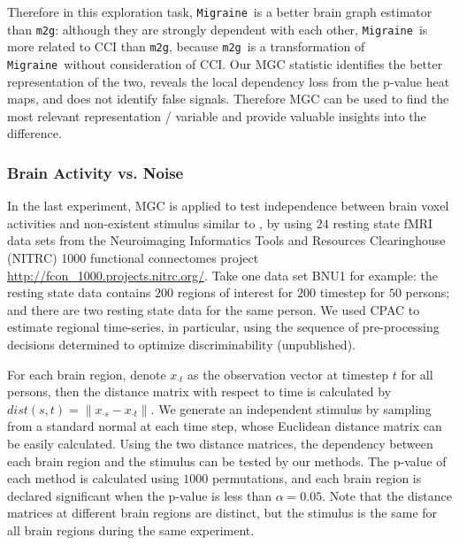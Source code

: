 \documentclass[11pt]{article}
\providecommand{\sct}[1]{{\sc \texttt{#1}}}
\newcommand{\Migraine}{\sct{Migraine}}
\newcommand{\mtg}{\sct{m2g}}
\begin{document}
Therefore in this exploration task, \Migraine~is a better brain graph estimator than \mtg: although they are strongly dependent with each other, \Migraine~is more related to CCI than \mtg, because \mtg~is a transformation of \Migraine~without consideration of CCI. Our MGC statistic identifies the better representation of the two, reveals the local dependency loss from the p-value heat maps, and does not identify false signals. Therefore MGC can be used to find the most relevant representation / variable and provide valuable insights into the difference.

\subsubsection{Brain Activity vs. Noise}

In the last experiment, MGC is applied to test independence between brain voxel activities and non-existent stimulus similar to \cite{EklundKnutsson2012}, by using $24$ resting state fMRI data sets from the Neuroimaging Informatics Tools and Resources Clearinghouse (NITRC) 1000 functional connectomes project \url{http://fcon_1000.projects.nitrc.org/}. Take one data set BNU1 for example: the resting state data contains $200$ regions of interest for $200$ timestep for $50$ persons; and there are 
two resting state data for the same person. We used CPAC to estimate regional time-series, in particular, using the sequence of pre-processing decisions determined to optimize discriminability (unpublished).

For each brain region, denote $x_{\cdot t}$ as the observation vector at timestep $t$ for all persons, then the distance matrix with respect to time is calculated by $dist(s,t)=\|x_{\cdot s}-x_{\cdot t}\|$. We generate an independent stimulus by sampling from a standard normal at each time step, whose Euclidean distance matrix can be easily calculated. Using the two distance matrices, the dependency between each brain region and the stimulus can be tested by our methods. The p-value of each method is calculated using $1000$ permutations, and each brain region is declared significant when the p-value is less than $\alpha=0.05$. Note that the distance matrices at different brain regions are distinct, but the stimulus is the same for all brain regions during the same experiment.
\end{document}
